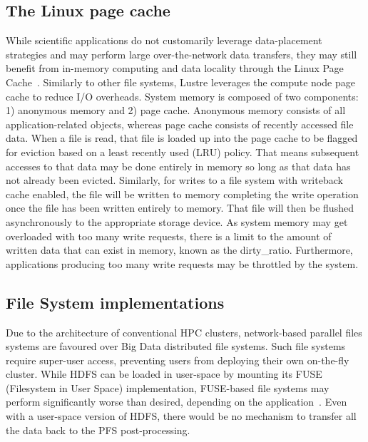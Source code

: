 \documentclass[10pt,journal,compsoc]{IEEEtran}
\begin{document}
\subsection{The Linux page cache}
 While scientific applications do not customarily leverage data-placement
      strategies and may perform large over-the-network data transfers, they may
      still benefit from in-memory computing and data locality through the Linux
      Page Cache~\cite{pagecache}. Similarly to other file systems, Lustre
      leverages the compute node page cache to reduce I/O overheads. System
      memory is composed of two components: 1) anonymous memory and 2) page
      cache. Anonymous memory consists of all application-related objects,
      whereas page cache consists of recently accessed file data. When a file is
      read, that file is loaded up into the page cache to be flagged for
      eviction based on a least recently used (LRU) policy. That means
      subsequent accesses to that data may be done entirely in memory so long as
      that data has not already been evicted. Similarly, for writes to a file
      system with writeback cache enabled, the file will be written to memory
      completing the write operation once the file has been written entirely to
      memory. That file will then be flushed asynchronously to the appropriate
      storage device. As system memory may get overloaded with too many write
      requests, there is a limit to the amount of written data that can exist in
      memory, known as the dirty\_ratio. Furthermore, applications producing too
      many write requests may be throttled by the system.

\subsection{File System implementations}
      Due to the architecture of conventional HPC clusters, network-based
      parallel files systems are favoured over Big Data distributed file
      systems. Such file systems require super-user access, preventing users
      from deploying their own on-the-fly cluster. While HDFS can be loaded in
      user-space by mounting its FUSE (Filesystem in User Space) implementation,
      FUSE-based file systems may perform significantly worse than desired,
      depending on the application~\cite{tofuse}. Even with a user-space version
      of HDFS, there would be no mechanism to transfer all the data back to the
      PFS post-processing.
      
\end{document}
